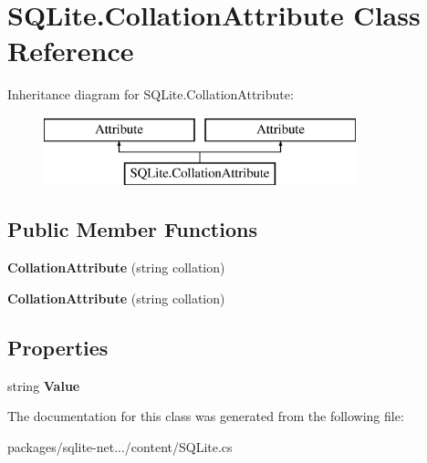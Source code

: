 \hypertarget{classSQLite_1_1CollationAttribute}{\section{S\-Q\-Lite.\-Collation\-Attribute Class Reference}
\label{classSQLite_1_1CollationAttribute}
}
Inheritance diagram for S\-Q\-Lite.\-Collation\-Attribute\-:\begin{figure}[H]
\begin{center}
\leavevmode
\includegraphics[height=2.000000cm]{classSQLite_1_1CollationAttribute}
\end{center}
\end{figure}
\subsection*{Public Member Functions}
\begin{DoxyCompactItemize}
\item 
\hypertarget{classSQLite_1_1CollationAttribute_a741b7b18adbbefa4c7922d254c8a3afc}{{\bfseries Collation\-Attribute} (string collation)}\label{classSQLite_1_1CollationAttribute_a741b7b18adbbefa4c7922d254c8a3afc}

\item 
\hypertarget{classSQLite_1_1CollationAttribute_a741b7b18adbbefa4c7922d254c8a3afc}{{\bfseries Collation\-Attribute} (string collation)}\label{classSQLite_1_1CollationAttribute_a741b7b18adbbefa4c7922d254c8a3afc}

\end{DoxyCompactItemize}
\subsection*{Properties}
\begin{DoxyCompactItemize}
\item 
\hypertarget{classSQLite_1_1CollationAttribute_a671ec768863418e52ff455d112063de2}{string {\bfseries Value}}\label{classSQLite_1_1CollationAttribute_a671ec768863418e52ff455d112063de2}

\end{DoxyCompactItemize}


The documentation for this class was generated from the following file\-:\begin{DoxyCompactItemize}
\item 
packages/sqlite-\/net.../content/S\-Q\-Lite.\-cs\end{DoxyCompactItemize}
